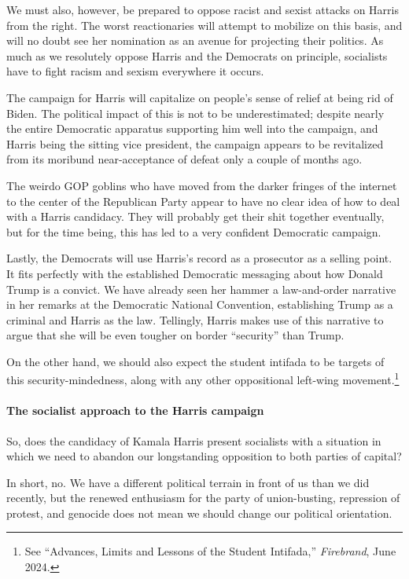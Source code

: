 We must also, however, be prepared to oppose racist and sexist attacks on Harris from the right. The worst reactionaries will attempt to mobilize on this basis, and will no doubt see her nomination as an avenue for projecting their politics. As much as we resolutely oppose Harris and the Democrats on principle, socialists have to fight racism and sexism everywhere it occurs.

The campaign for Harris will capitalize on people's sense of relief at being rid of Biden. The political impact of this is not to be underestimated; despite nearly the entire Democratic apparatus supporting him well into the campaign, and Harris being the sitting vice president, the campaign appears to be revitalized from its moribund near-acceptance of defeat only a couple of months ago.

The weirdo GOP goblins who have moved from the darker fringes of the internet to the center of the Republican Party appear to have no clear idea of how to deal with a Harris candidacy. They will probably get their shit together eventually, but for the time being, this has led to a very confident Democratic campaign.

Lastly, the Democrats will use Harris's record as a prosecutor as a selling point. It fits perfectly with the established Democratic messaging about how Donald Trump is a convict. We have already seen her hammer a law-and-order narrative in her remarks at the Democratic National Convention, establishing Trump as a criminal and Harris as the law. Tellingly, Harris makes use of this narrative to argue that she will be even tougher on border ``security'' than Trump.

On the other hand, we should also expect the student intifada to be targets of this security-mindedness, along with any other oppositional left-wing movement.\footnote{See ``Advances, Limits and Lessons of the Student Intifada,'' \emph{Firebrand}, June 2024.}

\paragraph{The socialist approach to the Harris campaign}

So, does the candidacy of Kamala Harris present socialists with a situation in which we need to abandon our longstanding opposition to both parties of capital?

In short, no. We have a different political terrain in front of us than we did recently, but the renewed enthusiasm for the party of union-busting, repression of protest, and genocide does not mean we should change our political orientation.

